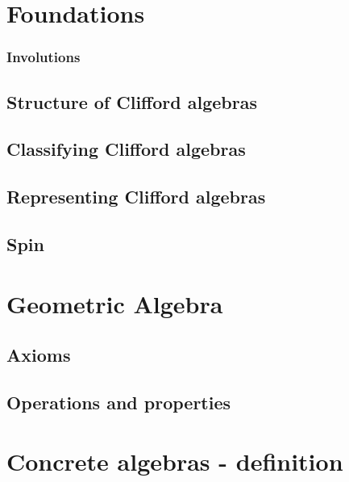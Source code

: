 \maketitle



\section{Foundations}
\label{cha:foundations}





\subsubsection{Involutions}

\subsection{Structure of Clifford algebras}

\subsection{Classifying Clifford algebras}

\subsection{Representing Clifford algebras}

\subsection{Spin}

\section{Geometric Algebra}

\subsection{Axioms}

\subsection{Operations and properties}

\section{Concrete algebras - definition}

